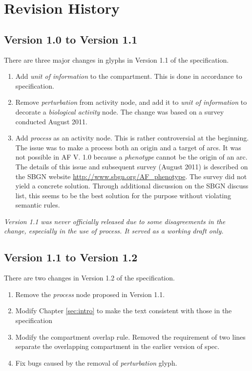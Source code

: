\chapter{Revision History}

\section{Version 1.0 to Version 1.1}

There are three major changes in glyphs in Version 1.1 of the \SBGNAFLone specification. 
\begin{enumerate}
\item{Add \emph{unit of information} to the compartment.  This is done in accordance to \SBGNPDLone specification.}
\item{Remove \emph{perturbation} from activity node, and add it to \emph{unit of information} to decorate a \emph{biological activity} node.  The change was based on a survey conducted August 2011.
}
\item{Add \emph{process} as an activity node. This is rather controversial at the beginning.  The issue was to make a process both an origin and a target of arcs.  It was not possible in AF V. 1.0 because a \emph{phenotype} cannot be the origin of an arc.  The details of this issue and subsequent survey (August 2011) is described on the SBGN website \url{http://www.sbgn.org/AF_phenotype}. The survey did not yield a concrete solution.  Through additional discussion on the SBGN discuss list, this seems to be the best solution for the purpose without violating semantic rules.
}
\end{enumerate}

\textit{Version 1.1 was never officially released due to some disagreements in the change, especially in the use of process. It served as a working draft only.}

\section{Version 1.1 to Version 1.2}

There are two changes in Version 1.2 of the \SBGNAFLone specification. 
\begin{enumerate}
\item{Remove the \emph{process} node proposed in Version 1.1.}
\item{Modify Chapter \ref{sec:intro} to make the text consistent with those in the \SBGNPDLone specification}
\item{Modify the compartment overlap rule. Removed the requirement of two lines separate the overlapping compartment in the earlier version of spec.}
\item{Fix bugs caused by the removal of \emph{perturbation} glyph.}
\end{enumerate}

